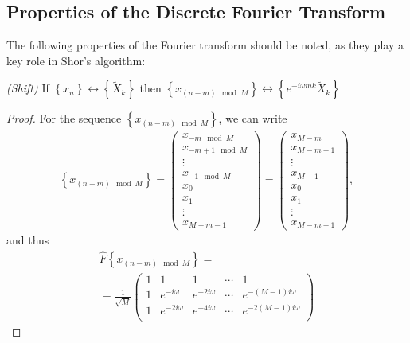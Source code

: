 \subsection{Properties of the Discrete Fourier Transform}

The following properties of the Fourier transform should be noted, as they play a key role in Shor's algorithm:

\begin{lemma}
\emph{(Shift)}
\label{lemmaAddFourierDiscretFourierShiftTime}
If $\left\{x_n\right\} \longleftrightarrow \left\{\tilde{X}_k\right\}$ then
$\left\{x_{\left(n - m\right) \mod M}\right\} \longleftrightarrow
\left\{e^{-i \omega m k}\tilde{X}_k\right\}$ 
\end{lemma}

\begin{proof}
For the sequence $\left\{x_{\left(n - m\right) \mod M}\right\}$, we can write
\begin{eqnarray}
\left\{x_{\left(n - m\right) \mod M}\right\} = 
\begin{pmatrix}
x_{-m \mod M} \\
x_{-m+1 \mod M}\\ 
\vdots \\
x_{-1 \mod M}\\
x_0 \\
x_1 \\
\vdots \\
x_{M - m - 1}
\end{pmatrix} = 
\begin{pmatrix}
x_{M - m} \\
x_{M - m + 1}\\ 
\vdots \\
x_{M - 1}\\
x_0 \\
x_1 \\
\vdots \\
x_{M - m - 1}
\end{pmatrix},
\nonumber
\end{eqnarray}
and thus
\begin{eqnarray}
\hat{F}\left\{x_{\left(n - m\right) \mod M}\right\} = 
\nonumber \\
= \frac{1}{\sqrt{M}}
\begin{pmatrix}
1 & 1 & 1 & \cdots & 1 \\
1 & e^{-i \omega} & e^{-2 i \omega} & \cdots & 
e^{-\left( M - 1 \right) i \omega} \\
1 & e^{-2 i \omega} & e^{-4 i \omega} & \cdots & 
e^{-2 \left( M - 1 \right) i \omega} \\

\end{pmatrix}
\end{eqnarray}
\end{proof}
